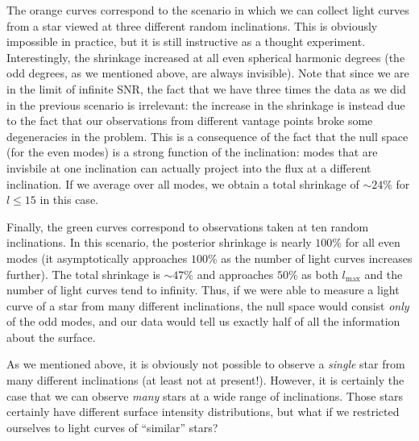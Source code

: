 \documentclass[modern]{aastex62}
\begin{document}
The orange curves correspond to the scenario in which we can collect light curves
from a star viewed at three different random inclinations. This is obviously
impossible in practice, but it is still instructive as a thought experiment.
Interestingly, the shrinkage increased at all even spherical harmonic degrees
(the odd degrees, as we mentioned above, are always invisible).
Note that since we are in the limit of infinite SNR, the fact that we have
three times the data as we did in the previous scenario is irrelevant: the
increase in the shrinkage is instead due to the fact that our observations
from different vantage points broke some degeneracies in the problem.
This is a consequence of the fact that the null space (for the even modes)
is a strong function of the inclination: modes that are invisbile
at one inclination can actually project into the flux at a different inclination.
If we average over all modes, we obtain a total shrinkage of $\sim 24\%$
for $l\leq15$ in this case.

Finally, the green curves correspond to observations taken at ten random
inclinations. In this scenario, the posterior shrinkage is nearly $100\%$
for all even modes (it asymptotically approaches $100\%$ as the number
of light curves increases further). The total shrinkage is $\sim 47\%$
and approaches $50\%$ as both $l_\mathrm{max}$  and the number of light curves
tend to infinity. Thus, if we were able to measure a light curve of a star
from many different inclinations, the null space would consist \emph{only}
of the odd modes, and our data would tell us exactly half of all the
information about the surface.

As we mentioned above, it is obviously not possible to observe a \emph{single}
star from many different inclinations (at least not at present!).
However, it is certainly the case that we can observe \emph{many} stars
at a wide range of inclinations. Those stars certainly have different
surface intensity distributions, but what if we restricted ourselves to
light curves of ``similar'' stars?
\end{document}
